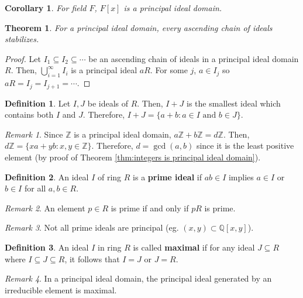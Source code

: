 \documentclass[11pt]{article}
\newtheorem{theorem}{Theorem}[definition]
\newtheorem{corollary}{Corollary}[definition]
\theoremstyle{definition}
\newtheorem{definition}{Definition}[section]
\theoremstyle{remark}
\newtheorem{remark}{Remark}[definition]
\begin{document}
\begin{corollary}
    For field $F$, $F[x]$ is a principal ideal domain.
\end{corollary}

\begin{theorem}
    For a principal ideal domain, every ascending chain of ideals stabilizes.
\end{theorem}

\begin{proof}
    Let $I_1\subseteq I_2\subseteq\cdots$ be an ascending chain of ideals in a
    principal ideal domain $R$.
    Then, $\bigcup_{i=1}^\infty I_i$ is a principal ideal $aR$.
    For some $j$, $a\in I_j$ so $aR=I_j=I_{j+1}=\cdots$.
\end{proof}

\begin{definition}
    Let $I,J$ be ideals of $R$. Then, $I+J$ is the smallest ideal which contains
    both $I$ and $J$.
    Therefore, $I+J=\{a+b:a\in I\text{ and }b\in J\}$.
\end{definition}

\begin{remark}
    Since $\mathbb{Z}$ is a principal ideal domain, $a\mathbb{Z}+b\mathbb{Z}=d\mathbb{Z}$.
    Then, $d\mathbb{Z}=\{xa+yb:x,y\in\mathbb{Z}\}$.
    Therefore, $d=\gcd(a,b)$ since it is the least positive element (by proof
    of Theorem \ref{thm:integers is principal ideal domain}).
\end{remark}

\begin{definition}
    An ideal $I$ of ring $R$ is a \textbf{prime ideal} if $ab\in I$ implies
    $a\in I$ or $b\in I$ for all $a,b\in R$.
\end{definition}

\begin{remark}
    An element $p\in R$ is prime if and only if $pR$ is prime.
\end{remark}

\begin{remark}
    Not all prime ideals are principal (eg. $(x,y)\subset\mathbb{Q}[x,y]$).
\end{remark}

\begin{definition}
    An ideal $I$ in ring $R$ is called \textbf{maximal} if for any ideal
    $J\subseteq R$ where $I\subseteq J\subseteq R$, it follows that $I=J$ or
    $J=R$.
\end{definition}

\begin{remark}
    In a principal ideal domain, the principal ideal generated by an
    irreducible element is maximal.
\end{remark}
\end{document}

